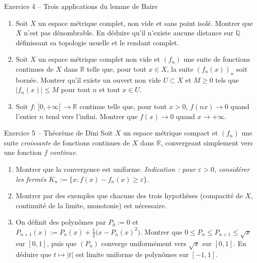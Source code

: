 \documentclass[11pt,a4paper]{article}
\newcommand{\R}{\mathbb{R}}
\newcommand{\Q}{\mathbb{Q}}
\theoremstyle{definition}
\begin{document}
\begin{exo}{Exercice 4 -- Trois applications du lemme de Baire}
\begin{enumerate}[label=(\alph*)]
  \item Soit $X$ un espace métrique complet, non vide et sans point isolé. Montrer que $X$ n'est pas dénombrable. En déduire qu'il n'existe aucune distance sur $\Q$ définissant sa topologie usuelle et le rendant complet.
  \item Soit $X$ un espace métrique complet non vide et $(f_n)$ une suite de fonctions continues de $X$ dans $\R$ telle que, pour tout $x\in X$, la suite $(f_n(x))_n$ soit bornée. Montrer qu'il existe un ouvert non vide $U\subset X$ et $M\ge0$ tels que $|f_n(x)|\le M$ pour tout $n$ et tout $x\in U$.
  \item Soit $f:\,]0,+\infty[\,\to\R$ continue telle que, pour tout $x>0$, $f(nx)\to0$ quand l'entier $n$ tend vers l'infini. Montrer que $f(x)\to0$ quand $x\to+\infty$.
\end{enumerate}
\end{exo}

\begin{exo}{Exercice 5 -- Théorème de Dini}
Soit $X$ un espace métrique compact et $(f_n)$ une suite \emph{croissante} de fonctions continues de $X$ dans $\R$, convergeant simplement vers une fonction $f$ \emph{continue}.
\begin{enumerate}[label=(\alph*)]
  \item Montrer que la convergence est uniforme. \emph{Indication : pour $\varepsilon>0$, considérer les fermés $K_n:=\{x:f(x)-f_n(x)\ge\varepsilon\}$.}
  \item Montrer par des exemples que chacune des trois hypothèses (compacité de $X$, continuité de la limite, monotonie) est nécessaire.
  \item On définit des polynômes par $P_0:=0$ et $P_{n+1}(x):=P_n(x)+\frac12\big(x-P_n(x)^2\big)$. Montrer que $0\le P_n\le P_{n+1}\le\sqrt x$ sur $[0,1]$, puis que $(P_n)$ converge uniformément vers $\sqrt x$ sur $[0,1]$. En déduire que $t\mapsto|t|$ est limite uniforme de polynômes sur $[-1,1]$.
\end{enumerate}
\end{exo}
\end{document}
